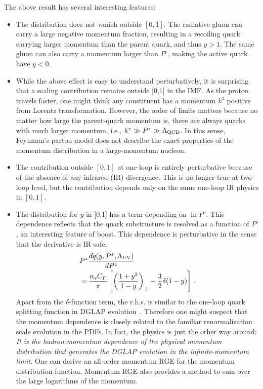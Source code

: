 The above result has several interesting features:
\begin{itemize}
	\item{The distribution does not vanish outside {$[0,1]$}.
		The radiative gluon can carry a large negative momentum fraction,
		resulting in a recoiling quark carrying larger momentum than the parent quark,
		and thus $y>1$. The same gluon can also carry a momentum larger than $P^z$,
		making the active quark have $y<0$.}
	
	\item{While the above effect is easy to understand perturbatively, it is
		surprising that a scaling contribution remains outside [0,1] in the IMF.
		As the proton travels faster,
		one might think any constituent has a momentum $k^z$ positive from Lorentz
		transformation. However, the order of limits matters because no matter
		how large the parent-quark momentum is, there are always quarks with much larger momentum, i.e.,
		$k^z\gg P^z \gg \Lambda_{\rm QCD}$. In this sense, Feynman's parton model does not describe
		the exact properties of the momentum distribution
		in a large-momentum nucleon.}
	
	\item{The contribution outside $[0,1]$ at one-loop is entirely perturbative because of the
		absence of any infrared (IR) divergence. This is no longer true at two-loop level, but
		the contribution depends only on the same one-loop IR physics in $[0,1]$. }
	
	\item{The distribution for $y$ in [0,1] has a term depending on $\ln P^z$. This dependence
		reflects that the quark substructure is resolved as a function of $P^z$, an interesting
		feature of boost.
		This dependence is perturbative in the sense that the derivative is
		IR safe,
		\begin{align}
			& P^z \frac{d \tilde q(y,P^z,\Lambda_{\rm UV})}{dP^z} \nonumber \\
			&= \frac{\alpha_s C_F}{\pi} \left[\left(\frac{1+y^2}{1-y}\right)_+ -\frac{3}{2}\delta(1-y) \right] \,.
		\end{align}
		Apart from the {$\delta$-function term}, the {r.h.s.} is similar to the one-loop
		quark splitting function in DGLAP evolution~\cite{Dokshitzer:1977sg,Gribov:1972ri,Altarelli:1977zs}. Therefore one might suspect that the momentum
		dependence is closely related to the familiar renormalization scale evolution in the
		PDFs. In fact, the physics is just the other way around: {\it It is the hadron-momentum dependence
			of the physical momentum distribution that generates
			the DGLAP evolution in the infinite-momentum limit.} One can derive an all-order momentum RGE for the momentum distribution function. Momentum RGE also provides a method
		to sum over the large logarithms of the momentum.}
	

\end{itemize}
